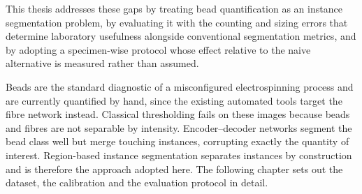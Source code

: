 This thesis addresses these gaps by treating bead quantification as an instance
segmentation problem, by evaluating it with the counting and sizing errors that
determine laboratory usefulness alongside conventional segmentation metrics, and
by adopting a specimen-wise protocol whose effect relative to the naive
alternative is measured rather than assumed.

Beads are the standard diagnostic of a misconfigured electrospinning process
and are currently quantified by hand, since the existing automated tools target the
fibre network instead. Classical thresholding fails on these images because
beads and fibres are not separable by intensity. Encoder--decoder networks segment
the bead class well but merge touching instances, corrupting exactly the
quantity of interest. Region-based instance segmentation separates instances by
construction and is therefore the approach adopted here. The following chapter sets
out the dataset, the calibration and the evaluation protocol in detail.
